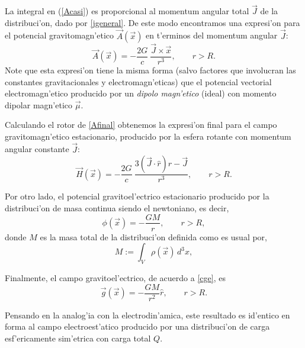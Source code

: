 La integral en (\ref{Acasi}) es proporcional al momentum angular total $\vec{J}$ de la distribuci'on, dado por \eqref{jgeneral}. De este modo encontramos una expresi'on para el potencial gravitomagn'etico $\vec{A}(\vec{x})$ en t'erminos del momentum angular $\vec{J}$:
\begin{equation}\boxed{
\vec{A}(\vec{x})=-\frac{2G}{c}\ \frac{\vec{J}\times\vec{x}}{r^3},\qquad r>R.}\label{Afinal}
\end{equation}
Note que esta expresi'on tiene la misma forma (salvo factores que involucran las constantes gravitacionales y electromagn'eticas) que el potencial vectorial electromagn'etico producido por un \textit{dipolo magn'etico} (ideal) con momento dipolar magn'etico $\vec{\mu}$.

Calculando el rotor de \eqref{Afinal} obtenemos la expresi'on final para el campo gravitomagn'etico estacionario, producido por la esfera rotante con momentum angular constante $\vec{J}$:
\begin{equation}\boxed{
\vec{H}(\vec{x})=-\frac{2G}{c}\ \frac{3(\vec{J}\cdot\hat{r})\hat{r}-\vec{J}}{r^3},\qquad r>R.}\label{Hgravito}
\end{equation}

Por otro lado, el potencial gravitoel'ectrico estacionario producido por la distribuci'on de masa continua siendo el newtoniano, es decir,
\begin{equation}\boxed{
\phi(\vec{x})=-\frac{GM}{r},\qquad r>R,}\label{phifinal}
\end{equation}
donde $M$ es la masa total de la distribuci'on definida como es usual por,
\begin{equation}
M:=\int_V \rho (\vec{x})\, d^3x,\label{masatotal}
\end{equation}

Finalmente, el campo gravitoel'ectrico, de acuerdo a \eqref{cge}, es
\begin{equation}\boxed{
\vec{g}(\vec{x})=-\frac{GM}{r^2}\hat{r},\qquad r>R.}\label{ggravito}
\end{equation}

Pensando en la analog'ia con la electrodin'amica, este resultado es id'entico en forma al campo electroest'atico producido por una distribuci'on de carga esf'ericamente sim'etrica con carga total $Q$.

